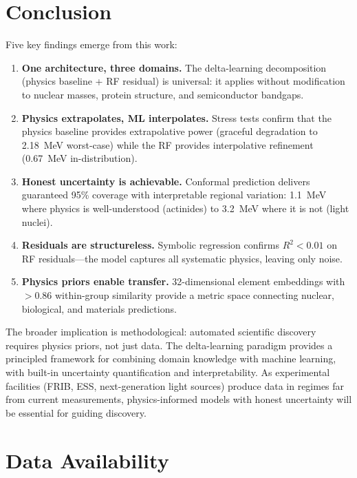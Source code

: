 \documentclass[twocolumn,letterpaper,10pt]{article}
\begin{document}
\section{Conclusion}
\label{sec:conclusion}

Five key findings emerge from this work:

\begin{enumerate}
  \item \textbf{One architecture, three domains.} The delta-learning
    decomposition (physics baseline + RF residual) is universal: it applies
    without modification to nuclear masses, protein structure, and
    semiconductor bandgaps.
  \item \textbf{Physics extrapolates, ML interpolates.} Stress tests confirm
    that the physics baseline provides extrapolative power (graceful
    degradation to 2.18~MeV worst-case) while the RF provides interpolative
    refinement (0.67~MeV in-distribution).
  \item \textbf{Honest uncertainty is achievable.} Conformal prediction
    delivers guaranteed 95\% coverage with interpretable regional variation:
    1.1~MeV where physics is well-understood (actinides) to 3.2~MeV where
    it is not (light nuclei).
  \item \textbf{Residuals are structureless.} Symbolic regression confirms
    $R^2 < 0.01$ on RF residuals---the model captures all systematic physics,
    leaving only noise.
  \item \textbf{Physics priors enable transfer.} 32-dimensional element
    embeddings with $>$0.86 within-group similarity provide a metric space
    connecting nuclear, biological, and materials predictions.
\end{enumerate}

The broader implication is methodological: automated scientific discovery
requires physics priors, not just data. The delta-learning paradigm provides
a principled framework for combining domain knowledge with machine learning,
with built-in uncertainty quantification and interpretability. As
experimental facilities (FRIB, ESS, next-generation light sources) produce
data in regimes far from current measurements, physics-informed models with
honest uncertainty will be essential for guiding discovery.

\section*{Data Availability}
\end{document}
